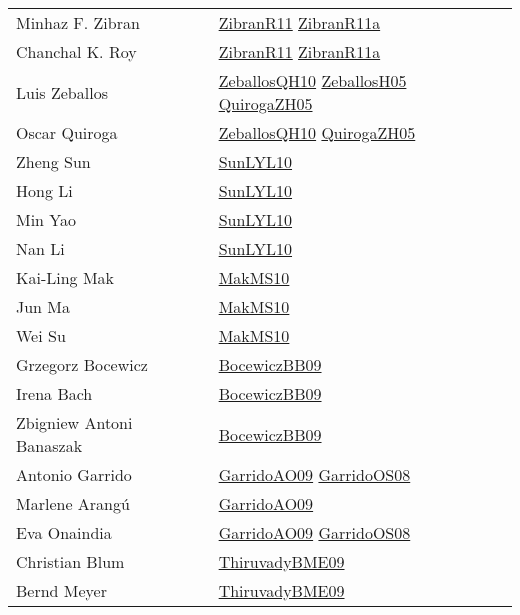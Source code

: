 {\begin{longtable}{p{4cm}p{15cm}}
Minhaz F. Zibran & \href{papers/ZibranR11.pdf}{ZibranR11}\cite{ZibranR11} \href{papers/ZibranR11a.pdf}{ZibranR11a}\cite{ZibranR11a} \\
Chanchal K. Roy & \href{papers/ZibranR11.pdf}{ZibranR11}\cite{ZibranR11} \href{papers/ZibranR11a.pdf}{ZibranR11a}\cite{ZibranR11a} \\
Luis Zeballos & \href{articles/ZeballosQH10.pdf}{ZeballosQH10}\cite{ZeballosQH10} \href{articles/ZeballosH05.pdf}{ZeballosH05}\cite{ZeballosH05} \href{papers/QuirogaZH05.pdf}{QuirogaZH05}\cite{QuirogaZH05} \\
Oscar Quiroga & \href{articles/ZeballosQH10.pdf}{ZeballosQH10}\cite{ZeballosQH10} \href{papers/QuirogaZH05.pdf}{QuirogaZH05}\cite{QuirogaZH05} \\
Zheng Sun & \href{papers/SunLYL10.pdf}{SunLYL10}\cite{SunLYL10} \\
Hong Li & \href{papers/SunLYL10.pdf}{SunLYL10}\cite{SunLYL10} \\
Min Yao & \href{papers/SunLYL10.pdf}{SunLYL10}\cite{SunLYL10} \\
Nan Li & \href{papers/SunLYL10.pdf}{SunLYL10}\cite{SunLYL10} \\
Kai{-}Ling Mak & \href{papers/MakMS10.pdf}{MakMS10}\cite{MakMS10} \\
Jun Ma & \href{papers/MakMS10.pdf}{MakMS10}\cite{MakMS10} \\
Wei Su & \href{papers/MakMS10.pdf}{MakMS10}\cite{MakMS10} \\
Grzegorz Bocewicz & \href{articles/BocewiczBB09.pdf}{BocewiczBB09}\cite{BocewiczBB09} \\
Irena Bach & \href{articles/BocewiczBB09.pdf}{BocewiczBB09}\cite{BocewiczBB09} \\
Zbigniew Antoni Banaszak & \href{articles/BocewiczBB09.pdf}{BocewiczBB09}\cite{BocewiczBB09} \\
Antonio Garrido & \href{articles/GarridoAO09.pdf}{GarridoAO09}\cite{GarridoAO09} \href{articles/GarridoOS08.pdf}{GarridoOS08}\cite{GarridoOS08} \\
Marlene Arang{\'{u}} & \href{articles/GarridoAO09.pdf}{GarridoAO09}\cite{GarridoAO09} \\
Eva Onaindia & \href{articles/GarridoAO09.pdf}{GarridoAO09}\cite{GarridoAO09} \href{articles/GarridoOS08.pdf}{GarridoOS08}\cite{GarridoOS08} \\
Christian Blum & \href{papers/ThiruvadyBME09.pdf}{ThiruvadyBME09}\cite{ThiruvadyBME09} \\
Bernd Meyer & \href{papers/ThiruvadyBME09.pdf}{ThiruvadyBME09}\cite{ThiruvadyBME09} \\

\end{longtable}}
